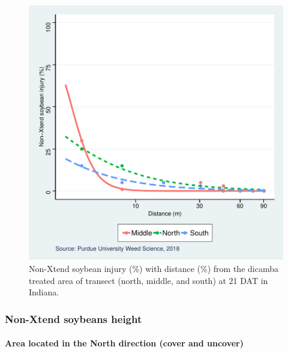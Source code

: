 \documentclass[]{article}
\let\oldparagraph\paragraph
\renewcommand{\paragraph}[1]{\oldparagraph{#1}\mbox{}}
\begin{document}
\begin{figure}
\centering
\includegraphics{Report_Dicamba_study_files/figure-latex/unnamed-chunk-34-1.pdf}
\caption{Non-Xtend soybean injury (\%) with distance (\%) from the
dicamba treated area of transect (north, middle, and south) at 21 DAT in
Indiana.}
\end{figure}

\newpage

\pagebreak

\subsubsection{Non-Xtend soybeans
height}\label{non-xtend-soybeans-height-2}

\paragraph{\texorpdfstring{Area located in the \textbf{North} direction
(cover and
uncover)}{Area located in the North direction (cover and uncover)}}\label{area-located-in-the-north-direction-cover-and-uncover-1}
\end{document}
